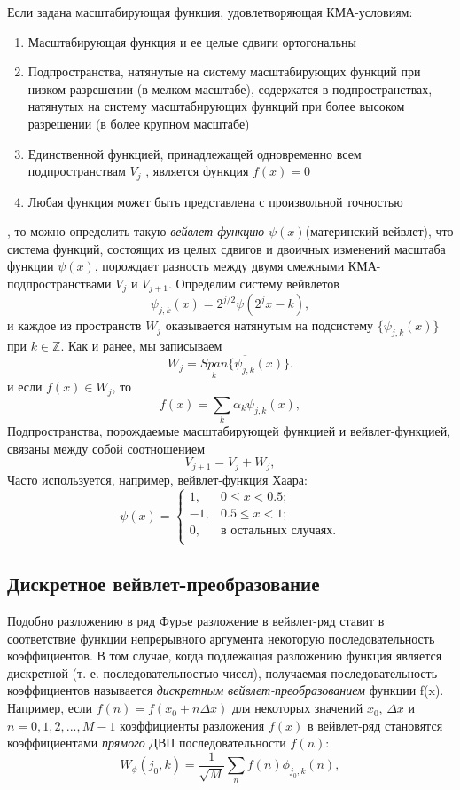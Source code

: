 \documentclass[12pt]{article}
\begin{document}
Если задана масштабирующая функция, удовлетворяющая КМА-условиям:
\begin{enumerate}
\item Масштабирующая функция и ее целые сдвиги ортогональны
\item Подпространства, натянутые на систему масштабирующих
функций при низком разрешении (в мелком масштабе), содержатся в подпространствах, натянутых на систему масштабирующих функций при более высоком разрешении (в более крупном масштабе)
\item Единственной функцией, принадлежащей одновременно всем
подпространствам $V_j$ , является функция $f(x) = 0$
\item Любая функция может быть представлена с произвольной
точностью
\end{enumerate}
, то можно определить такую \textit{вейвлет-функцию} $\psi(x)$(материнский вейвлет), что система функций, состоящих из целых сдвигов и двоичных изменений масштаба функции $\psi(x)$, порождает разность между двумя смежными КМА-подпространствами $V_j$ и $V_{j+1}$. Определим систему вейвлетов
\[
\psi_{j,k}(x) = 2^{j/2}\psi(2^j x - k), \tag{6}
\]
и каждое из пространств $W_j$ оказывается натянутым на подсистему
$\{\psi_{j,k}(x)\}$ при $k \in \mathbb{Z}$. Как и ранее, мы записываем
\[
W_j = \overline{\underset{k}{Span}\{\psi_{j,k}(x)\}}. \tag{7}
\]
и если $f(x) \in W_j$, то
\[
f(x) = \sum_k \alpha_k \psi_{j,k}(x), \tag{8}
\]
Подпространства, порождаемые масштабирующей функцией
и вейвлет-функцией, связаны между собой соотношением
\[
V_{j+1} = V_j + W_j, \tag{9}
\]
Часто используется, например, вейвлет-функция Хаара:\\
\[
\psi(x) = 
\begin{cases}
1,    & 0 \leq x < 0.5;\\
-1,   & 0.5 \leq x < 1;\\
0,    & \text{в остальных случаях.}\\
\end{cases}
\tag{10}
\]

\subsection*{Дискретное вейвлет-преобразование}
Подобно разложению в ряд Фурье разложение в вейвлет-ряд ставит в соответствие функции непрерывного аргумента некоторую последовательность коэффициентов. В том случае, когда подлежащая разложению функция является дискретной (т. е. последовательностью чисел), получаемая последовательность коэффициентов называется \textit{дискретным вейвлет-преобразованием} функции f(x). Например, если $f(n) = f(x_0 + n\Delta x)$ для некоторых значений $x_0$, $\Delta x$ и $n = 0, 1, 2, ..., M - 1$ коэффициенты разложения
$f(x)$ в вейвлет-ряд становятся коэффициентами \textit{прямого} ДВП последовательности $f(n)$:
\[
W_\phi(j_0,k) = \dfrac{1}{\sqrt{M}} \sum_n f(n) \phi_{j_0,k}(n),
\tag{11}
\]
\end{document}
